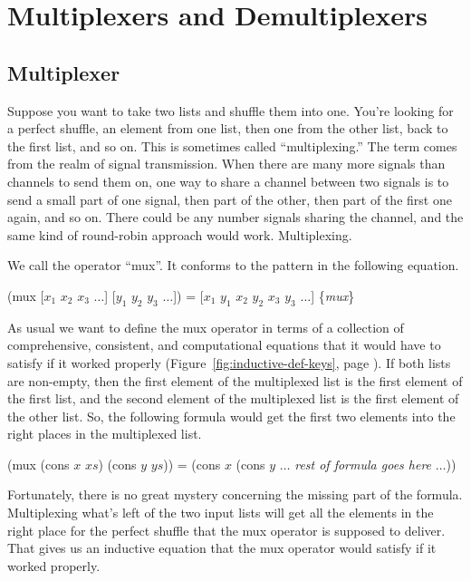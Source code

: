 \chapter{Multiplexers and Demultiplexers}
\label{ch:mux-dmx}

\section{Multiplexer}
\label{sec:mux}

Suppose you want to take two lists and shuffle them into one.
You're looking for a perfect shuffle,
an element from one list,
then one from the other list, back to the first list, and so on.
This is sometimes called ``multiplexing.''
The term comes from the realm of signal transmission.
When there are many more signals than channels to send them on,
one way to share a channel between two signals is to
send a small part of one signal, then part of the other,
then part of the first one again, and so on.
There could be any number signals sharing the channel,
and the same kind of round-robin approach would work.
Multiplexing.

We call the operator
``mux''.
It conforms to the pattern in the following equation.

\hspace{1cm} (mux [$x_1$ $x_2$ $x_3$ $\dots$] [$y_1$ $y_2$ $y_3$ $\dots$]) =
     [$x_1$ $y_1$ $x_2$ $y_2$ $x_3$ $y_3$ $\dots$] \hfill \{\emph{mux}\}

As usual we want to define the mux operator in terms of
a collection of comprehensive, consistent, and computational equations
that it would have to satisfy if it worked properly
(Figure~\ref{fig:inductive-def-keys}, page \pageref{fig:inductive-def-keys}).
If both lists are non-empty,
then the first element of the multiplexed list is the first element of the first list,
and the second element of the multiplexed list is the first element of the other list.
So, the following formula would
get the first two elements into the right places in the multiplexed list.

\hspace{1cm} (mux (cons $x$ $xs$) (cons $y$ $ys$)) =
(cons $x$ (cons $y$ $\dots$ \emph{rest of formula goes here} $\dots$))

Fortunately, there is no great mystery concerning the missing part of the formula.
Multiplexing what's left of the two input lists will get all the elements
in the right place for the perfect shuffle that the mux operator is supposed to deliver.
That gives us an inductive equation that the mux operator
would satisfy if it worked properly.

